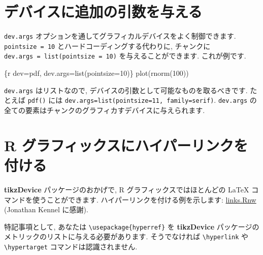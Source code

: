 \documentclass[
  lualatex,ja=standard,jafont=noto-otf]{bxjsreport}
\newenvironment{Shaded}{\begin{snugshade}}{\end{snugshade}}
\newcommand{\AttributeTok}[1]{\textcolor[rgb]{0.13,0.29,0.53}{#1}}
\newcommand{\StringTok}[1]{\textcolor[rgb]{0.31,0.60,0.02}{#1}}
\begin{document}
\hypertarget{ux30c7ux30d0ux30a4ux30b9ux306bux8ffdux52a0ux306eux5f15ux6570ux3092ux4e0eux3048ux308b}{%
\section*{デバイスに追加の引数を与える}\label{ux30c7ux30d0ux30a4ux30b9ux306bux8ffdux52a0ux306eux5f15ux6570ux3092ux4e0eux3048ux308b}}

\texttt{dev.args}
オプションを通してグラフィカルデバイスをよく制御できます.
\texttt{pointsize\ =\ 10} とハードコーディングする代わりに, チャンクに
\texttt{dev.args\ =\ list(pointsize\ =\ 10)} を与えることができます.
これが例です.

\begin{Shaded}
\begin{Highlighting}[]
\StringTok{\textasciigrave{}\textasciigrave{}\textasciigrave{}}\AttributeTok{\{r dev=\textquotesingle{}pdf\textquotesingle{}, dev.args=list(pointsize=10)\}}
\AttributeTok{plot(rnorm(100))}
\StringTok{\textasciigrave{}\textasciigrave{}\textasciigrave{}}
\end{Highlighting}
\end{Shaded}

\texttt{dev.args} はリストなので,
デバイスの引数として可能なものを取るべきです. たとえば \texttt{pdf()}
には
\texttt{dev.args=list(pointsize=11,\ family=\textquotesingle{}serif\textquotesingle{})}.
\texttt{dev.args}
の全ての要素はチャンクのグラフィカすデバイスに与えられます.

\hypertarget{r-ux30b0ux30e9ux30d5ux30a3ux30c3ux30afux30b9ux306bux30cfux30a4ux30d1ux30fcux30eaux30f3ux30afux3092ux4ed8ux3051ux308b}{%
\section*{R
グラフィックスにハイパーリンクを付ける}\label{r-ux30b0ux30e9ux30d5ux30a3ux30c3ux30afux30b9ux306bux30cfux30a4ux30d1ux30fcux30eaux30f3ux30afux3092ux4ed8ux3051ux308b}}

\textbf{tikzDevice} パッケージのおかげで, R グラフィックスではほとんどの
LaTeX コマンドを使うことができます. ハイパーリンクを付ける例を示します:
\href{https://gist.github.com/1937313}{links.Rnw} (Jonathan Kennel
に感謝).

特記事項として, あなたは \texttt{\textbackslash{}usepackage\{hyperref\}}
を \textbf{tikzDevice}
パッケージのメトリックのリストに与える必要があります. そうでなければ
\texttt{\textbackslash{}hyperlink} や
\texttt{\textbackslash{}hypertarget} コマンドは認識されません.
\end{document}
